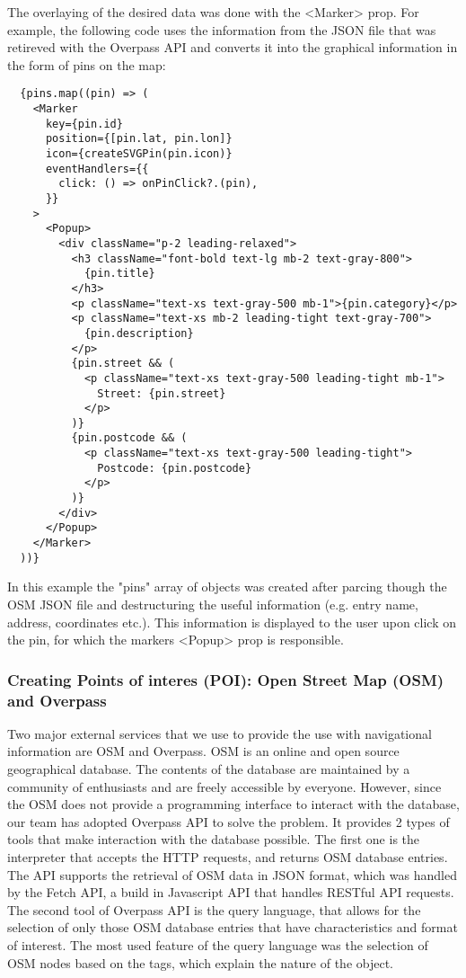 The overlaying of the desired data was done with the <Marker> prop. For example, the following code uses the information from the JSON file that was retireved with the Overpass API and converts it into the graphical information in the form of pins on the map:
\begin{verbatim}
  {pins.map((pin) => (
    <Marker
      key={pin.id}
      position={[pin.lat, pin.lon]}
      icon={createSVGPin(pin.icon)}
      eventHandlers={{
        click: () => onPinClick?.(pin),
      }}
    >
      <Popup>
        <div className="p-2 leading-relaxed">
          <h3 className="font-bold text-lg mb-2 text-gray-800">
            {pin.title}
          </h3>
          <p className="text-xs text-gray-500 mb-1">{pin.category}</p>
          <p className="text-xs mb-2 leading-tight text-gray-700">
            {pin.description}
          </p>
          {pin.street && (
            <p className="text-xs text-gray-500 leading-tight mb-1">
              Street: {pin.street}
            </p>
          )}
          {pin.postcode && (
            <p className="text-xs text-gray-500 leading-tight">
              Postcode: {pin.postcode}
            </p>
          )}
        </div>
      </Popup>
    </Marker>
  ))}
\end{verbatim}
In this example the "pins" array of objects was created after parcing though the OSM JSON file and destructuring the useful information (e.g. entry name, address, coordinates etc.). This information is displayed to the user upon click on the pin, for which the markers <Popup> prop is responsible. 

\subsubsection{Creating Points of interes (POI): Open Street Map (OSM) and Overpass}

Two major external services that we use to provide the use with navigational information are OSM and Overpass. OSM is an online and open source geographical database. The contents of the database are maintained by a community of enthusiasts and are freely accessible by everyone. However,  since the OSM does not provide a programming interface to interact with the database, our team has adopted Overpass API to solve the problem. It provides 2 types of tools that make interaction with the database possible. The first one is the interpreter that accepts the HTTP requests, and returns OSM database entries. The API supports the retrieval of OSM data in JSON format, which was handled by the Fetch API, a build in Javascript API that handles RESTful API requests. The second tool of Overpass API is the query language, that allows for the selection of only those OSM database entries that have characteristics and format of interest. The most used feature of the query language was the selection of OSM nodes based on the tags, which explain the nature of the object. 

